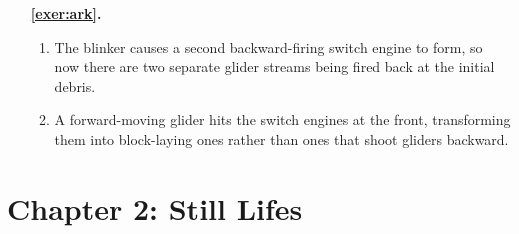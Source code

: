 \begin{multicols}{2}
\begin{itemize}[leftmargin=0em]
		\item[\bf\color{ocre}\sffamily\ref{exer:ark}.] \begin{enumerate}[leftmargin=1.5em,label=\bf\color{ocre}(\alph*)]
		\item The blinker causes a second backward-firing switch engine to form, so now there are two separate glider streams being fired back at the initial debris.
		
		\item A forward-moving glider hits the switch engines at the front, transforming them into block-laying ones rather than ones that shoot gliders backward. \\
		\end{enumerate}
	\end{itemize}
\end{multicols}


\hypertarget{solutions_still_lifes}{}\label{solutions_still_lifes}
\section*{Chapter 2: Still Lifes}
\renewcommand{\chapterfolder}{still_lifes/}

